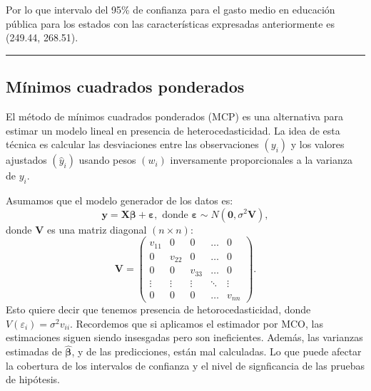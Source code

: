 \documentclass[
]{article}
\begin{document}
Por lo que intervalo del 95\% de confianza para el gasto medio en educación pública para los estados con las características expresadas anteriormente es (249.44, 268.51).

\rule{\textwidth}{0.4pt}

\hypertarget{muxednimos-cuadrados-ponderados}{%
\subsection{Mínimos cuadrados ponderados}\label{muxednimos-cuadrados-ponderados}}

El método de mínimos cuadrados ponderados (MCP) es una alternativa para estimar un modelo lineal en presencia de heterocedasticidad. La idea de esta técnica es calcular las desviaciones entre las observaciones \((y_{i})\) y los valores ajustados \((\widehat{y}_{i})\) usando pesos \((w_{i})\) inversamente proporcionales a la varianza de \(y_{i}\).

Asumamos que el modelo generador de los datos es:
\begin{equation}
\boldsymbol y= \boldsymbol X\boldsymbol \beta+ \boldsymbol \varepsilon, \mbox{ donde }\boldsymbol \varepsilon\sim N(\boldsymbol 0,\sigma^{2}\boldsymbol V),
\label{eq:modV}
\end{equation}
donde \(\boldsymbol V\) es una matriz diagonal \((n \times n)\):
\[
\boldsymbol V= \begin{pmatrix}
v_{11} & 0 & 0 & \ldots & 0 \\
0 & v_{22} & 0 & \ldots & 0 \\
0 & 0 & v_{33} & \ldots & 0 \\
\vdots & \vdots & \vdots & \ddots & \vdots \\
0 & 0 & 0 & \ldots & v_{nn}
\end{pmatrix}.
\]
Esto quiere decir que tenemos presencia de hetorocedasticidad, donde \(V(\varepsilon_{i}) = \sigma^{2}v_{ii}\). Recordemos que si aplicamos el estimador por MCO, las estimaciones siguen siendo insesgadas pero son ineficientes. Además, las varianzas estimadas de \(\widehat{\boldsymbol \beta}\), y de las predicciones, están mal calculadas. Lo que puede afectar la cobertura de los intervalos de confianza y el nivel de signficancia de las pruebas de hipótesis.
\end{document}
